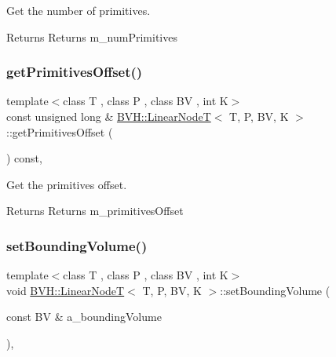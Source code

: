 Get the number of primitives. 

\begin{DoxyReturn}{Returns}
Returns m\+\_\+num\+Primitives 
\end{DoxyReturn}
\mbox{\label{classBVH_1_1LinearNodeT_a8cfca65bd808adc8eb2793e7d7aabcd3}} 
\subsubsection{\texorpdfstring{get\+Primitives\+Offset()}{getPrimitivesOffset()}}
{\footnotesize\ttfamily template$<$class T , class P , class BV , int K$>$ \\
const unsigned long \& \hyperlink{classBVH_1_1LinearNodeT}{B\+V\+H\+::\+Linear\+NodeT}$<$ T, P, BV, K $>$\+::get\+Primitives\+Offset (\begin{DoxyParamCaption}{ }\end{DoxyParamCaption}) const\hspace{0.3cm}{\ttfamily [inline]}, {\ttfamily [noexcept]}}



Get the primitives offset. 

\begin{DoxyReturn}{Returns}
Returns m\+\_\+primitives\+Offset 
\end{DoxyReturn}
\mbox{\label{classBVH_1_1LinearNodeT_a03e3dd1c74bf9e66ed692130b49c2e0f}} 
\subsubsection{\texorpdfstring{set\+Bounding\+Volume()}{setBoundingVolume()}}
{\footnotesize\ttfamily template$<$class T , class P , class BV , int K$>$ \\
void \hyperlink{classBVH_1_1LinearNodeT}{B\+V\+H\+::\+Linear\+NodeT}$<$ T, P, BV, K $>$\+::set\+Bounding\+Volume (\begin{DoxyParamCaption}\item[{const BV \&}]{a\+\_\+bounding\+Volume }\end{DoxyParamCaption})\hspace{0.3cm}{\ttfamily [inline]}, {\ttfamily [noexcept]}}



